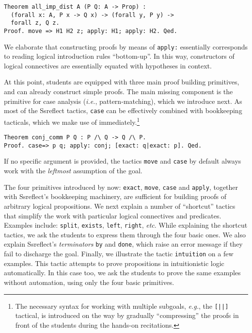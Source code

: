 \documentclass[blockstyle,preprint]{sigplanconf}
\newcommand{\is}[1]{\textcolor{blue}{(Ilya: {#1})}}
\newcommand{\an}[1]{\textcolor{red}{(Aleks: {#1})}}
\newcommand{\code}[1]{\lstinline{#1}}
\newcommand{\etc}{\emph{etc}}
\newcommand{\ie}{\emph{i.e.}\xspace}
\newcommand{\eg}{\emph{e.g.}\xspace}
\begin{document}

\begin{lstlisting}
Theorem all_imp_dist A (P Q: A -> Prop) : 
  (forall x: A, P x -> Q x) -> (forall y, P y) -> 
  forall z, Q z. 
Proof. move => H1 H2 z; apply: H1; apply: H2. Qed.
\end{lstlisting}
%
We elaborate that constructing proofs by means of \code{apply:}
essentially corresponds to reading logical introduction rules
``bottom-up''. In this way, constructors of logical connectives are
essentially equated with hypotheses in context.

At this point, students are equipped with three main proof building
primitives, and can already construct simple proofs. The main missing
component is the primitive for case analysis (\ie, pattern-matching),
which we introduce next. As most of the Ssreflect tactics, \code{case}
can be effectively combined with bookkeeping tacticals, which we make
use of immediately.\footnote{The necessary syntax for working with
  multiple subgoals, \eg, the \code{[||]} tactical, is introduced on
  the way by gradually ``compressing'' the proofs in front of the
  students during the hands-on recitations.}
%
\begin{lstlisting}
Theorem conj_comm P Q : P /\ Q -> Q /\ P.
Proof. case=> p q; apply: conj; [exact: q|exact: p]. Qed.
\end{lstlisting}
%
If no specific argument is provided, the tactics \code{move} and
\code{case} by default always work with the \emph{leftmost} assumption
of the goal.

The four primitives introduced by now: \code{exact}, \code{move},
\code{case} and \code{apply}, together with Ssreflect's bookkeeping
machinery, are sufficient for building proofs of arbitrary logical
propositions.
%
%
%
%
We next explain a number of ``shortcut'' tactics that simplify the
work with particular logical connectives and predicates. Examples
include: \code{split}, \code{exists}, \code{left}, \code{right}, \etc.
While explaining the shortcut tactics, we ask the students to express
them through the four basic ones. We also explain Ssreflect's
\emph{terminators} \code{by} and \code{done}, which raise an error
message if they fail to discharge the goal. Finally, we illustrate the
tactic \code{intuition} on a few examples. This tactic attempts to
prove propositions in intuitionistic logic automatically. In this case
too, we ask the students to prove the same examples without
automation, using only the four basic primitives.
\end{document}
